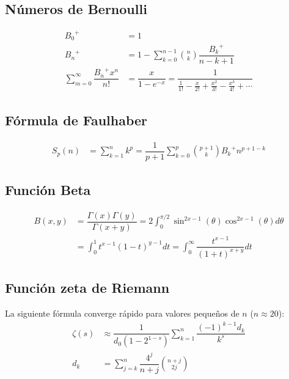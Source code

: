 \documentclass[11pt]{article}
\begin{document}
		\subsection{Números de Bernoulli}
			\begin{align*}
				{B_0}^+ &= 1 \\
				{B_n}^+ &= 1 - \sum_{k=0}^{n-1}\binom{n}{k}\dfrac{{B_k}^+}{n-k+1} \\
				\sum_{m=0}^{\infty} \dfrac{{B_n}^+ x^n}{n!} &= \dfrac{x}{1-e^{-x}} = \dfrac{1}{\frac{1}{1!}-\frac{x}{2!}+\frac{x^2}{3!}-\frac{x^3}{4!}+\cdots}
			\end{align*}
		
		\subsection{Fórmula de Faulhaber}
			\begin{align*}
				S_p(n) &= \sum_{k=1}^{n}k^p = \dfrac{1}{p+1}\sum_{k=0}^{p} \binom{p+1}{k} {B_k}^+ n^{p+1-k}
			\end{align*}
		
		\subsection{Función Beta}
			\begin{align*}
				B(x,y) &= \dfrac{\Gamma(x)\Gamma(y)}{\Gamma(x+y)} = 2 \int_{0}^{\pi/2} \sin^{2x-1}(\theta) \cos^{2x-1}(\theta) d\theta \\
				&= \int_{0}^{1} t^{x-1} (1-t)^{y-1} dt = \int_{0}^{\infty} \dfrac{t^{x-1}}{(1+t)^{x+y}} dt
			\end{align*}
			
		\subsection{Función zeta de Riemann}
			La siguiente fórmula converge rápido para valores pequeños de $n$ ($n \approx 20$):
			\begin{align*}
				\zeta(s) &\approx \dfrac{1}{d_0 (1 - 2^{1-s})} \sum_{k=1}^{n} \dfrac{(-1)^{k-1} d_k}{k^s} \\
				d_k &= \sum_{j=k}^{n} \dfrac{4^j}{n+j} \binom{n+j}{2j}
			\end{align*}
		
\end{document}
